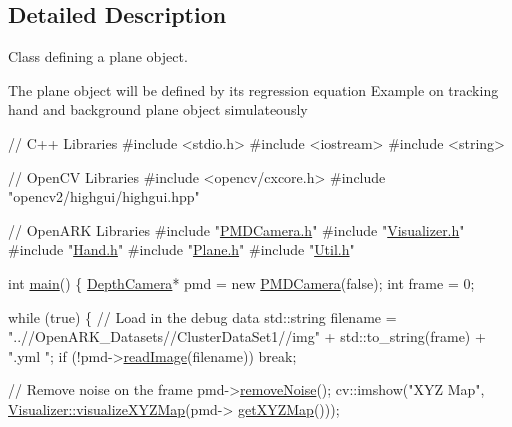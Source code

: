 \subsection{Detailed Description}
Class defining a plane object. 

The plane object will be defined by its regression equation Example on tracking hand and background plane object simulateously 
\begin{DoxyCodeInclude}
\textcolor{comment}{// C++ Libraries}
\textcolor{preprocessor}{#include <stdio.h>}
\textcolor{preprocessor}{#include <iostream>}
\textcolor{preprocessor}{#include <string>}

\textcolor{comment}{// OpenCV Libraries}
\textcolor{preprocessor}{#include <opencv/cxcore.h>}
\textcolor{preprocessor}{#include "opencv2/highgui/highgui.hpp"}

\textcolor{comment}{// OpenARK Libraries}
\textcolor{preprocessor}{#include "\hyperlink{_p_m_d_camera_8h}{PMDCamera.h}"}
\textcolor{preprocessor}{#include "\hyperlink{_visualizer_8h}{Visualizer.h}"}
\textcolor{preprocessor}{#include "\hyperlink{_hand_8h}{Hand.h}"}
\textcolor{preprocessor}{#include "\hyperlink{_plane_8h}{Plane.h}"}
\textcolor{preprocessor}{#include "\hyperlink{_util_8h}{Util.h}"}

\textcolor{keywordtype}{int} \hyperlink{main_8cpp_ae66f6b31b5ad750f1fe042a706a4e3d4}{main}() \{
    \hyperlink{class_depth_camera}{DepthCamera}* pmd = \textcolor{keyword}{new} \hyperlink{class_p_m_d_camera}{PMDCamera}(\textcolor{keyword}{false});
    \textcolor{keywordtype}{int} frame = 0;
    
    \textcolor{keywordflow}{while} (\textcolor{keyword}{true})
    \{
        \textcolor{comment}{// Load in the debug data}
        std::string filename = \textcolor{stringliteral}{"..//OpenARK\_Datasets//ClusterDataSet1//img"} + std::to\_string(frame) + \textcolor{stringliteral}{".yml
      "};
        \textcolor{keywordflow}{if} (!pmd->\hyperlink{class_depth_camera_a21cf887a447d2cdfda6ac907662c55fe}{readImage}(filename))
            \textcolor{keywordflow}{break};
        
        \textcolor{comment}{// Remove noise on the frame}
        pmd->\hyperlink{class_depth_camera_adc06db6509cc5f47de1e168f56bf41fa}{removeNoise}();
        cv::imshow(\textcolor{stringliteral}{"XYZ Map"}, \hyperlink{class_visualizer_a24caf117be9878e2f5ad35cabb7f4f88}{Visualizer::visualizeXYZMap}(pmd->
      \hyperlink{class_depth_camera_a0c295c5a0696550f453b1c8cd0fcb188}{getXYZMap}()));
        

\end{DoxyCodeInclude}
